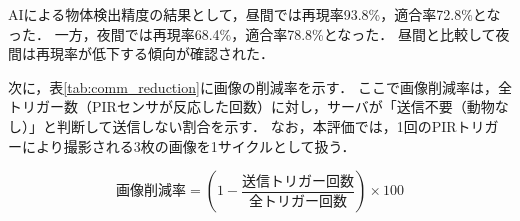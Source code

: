 \documentclass[technicalreport]{ieicej}
\begin{document}
\begin{table}[tb]
    \caption{AI検出精度 (昼間および夜間, 閾値: 0.05)}
    \label{tab:ai_accuracy}
    \centering
\end{table}

AIによる物体検出精度の結果として，昼間では再現率93.8\%，適合率72.8\%となった．
一方，夜間では再現率68.4\%，適合率78.8\%となった．
昼間と比較して夜間は再現率が低下する傾向が確認された．

次に，表\ref{tab:comm_reduction}に画像の削減率を示す．
ここで画像削減率は，全トリガー数（PIRセンサが反応した回数）に対し，サーバが「送信不要（動物なし）」と判断して送信しない割合を示す．
なお，本評価では，1回のPIRトリガーにより撮影される3枚の画像を1サイクルとして扱う．

\begin{equation}
    \text{画像削減率} = \left( 1 - \frac{\text{送信トリガー回数}}{\text{全トリガー回数}} \right) \times 100
\end{equation}
\end{document}
